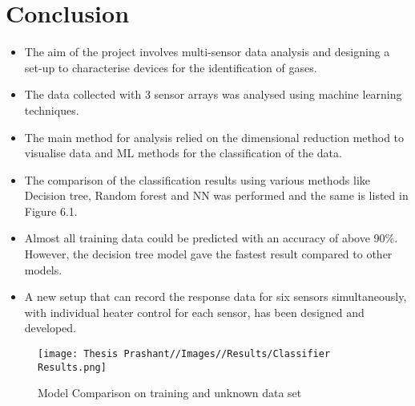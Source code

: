 \chapter{Conclusion}
\begin{itemize}
    \item The aim of the project involves multi-sensor data analysis and designing a set-up to characterise devices for the identification of gases. 
    \item The data collected with 3 sensor arrays was analysed using machine learning techniques.
    \item The main method for analysis relied on the dimensional reduction method to visualise data and ML methods for the classification of the data.
    \item The comparison of the classification results using various methods like Decision tree, Random forest and NN was performed and the same is listed in Figure 6.1.
    \item Almost all training data could be predicted with an accuracy of above 90\%. However, the decision tree model gave the fastest result compared to other models.
    \item A new setup that can record the response data for six sensors simultaneously, with individual heater control for each sensor, has been designed and developed.
\end{itemize}

\begin{figure}
    \centering
    \texttt{[image: Thesis Prashant//Images//Results/Classifier Results.png]}
    \caption{Model Comparison on training and unknown data set}
    \label{fig:enter-label}
\end{figure}









